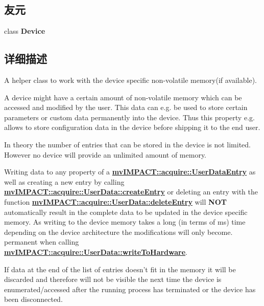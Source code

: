 \subsection*{友元}
\begin{DoxyCompactItemize}
\item 
\hypertarget{classmv_i_m_p_a_c_t_1_1acquire_1_1_user_data_a520fa05e0bf58785da428f7a0241eee2}{class {\bfseries Device}}\label{classmv_i_m_p_a_c_t_1_1acquire_1_1_user_data_a520fa05e0bf58785da428f7a0241eee2}

\end{DoxyCompactItemize}


\subsection{详细描述}
A helper class to work with the device specific non-\/volatile memory(if available). 

A device might have a certain amount of non-\/volatile memory which can be accessed and modified by the user. This data can e.\+g. be used to store certain parameters or custom data permanently into the device. Thus this property e.\+g. allows to store configuration data in the device before shipping it to the end user.

In theory the number of entries that can be stored in the device is not limited. However no device will provide an unlimited amount of memory.

Writing data to any property of a {\bfseries \hyperlink{classmv_i_m_p_a_c_t_1_1acquire_1_1_user_data_entry}{mv\+I\+M\+P\+A\+C\+T\+::acquire\+::\+User\+Data\+Entry}} as well as creating a new entry by calling {\bfseries \hyperlink{classmv_i_m_p_a_c_t_1_1acquire_1_1_user_data_a693c8931c71b9911657636bd07ab1e09}{mv\+I\+M\+P\+A\+C\+T\+::acquire\+::\+User\+Data\+::create\+Entry}} or deleting an entry with the function {\bfseries \hyperlink{classmv_i_m_p_a_c_t_1_1acquire_1_1_user_data_a5c3bcff4890369e8c8b446fa0344e7ed}{mv\+I\+M\+P\+A\+C\+T\+::acquire\+::\+User\+Data\+::delete\+Entry}} will {\bfseries N\+O\+T} automatically result in the complete data to be updated in the device specific memory. As writing to the device memory takes a long (in terms of ms) time depending on the device architecture the modifications will only become. permanent when calling {\bfseries \hyperlink{classmv_i_m_p_a_c_t_1_1acquire_1_1_user_data_ae6e2e87a923281c6a821b0f221b968b8}{mv\+I\+M\+P\+A\+C\+T\+::acquire\+::\+User\+Data\+::write\+To\+Hardware}}.

If data at the end of the list of entries doesn't fit in the memory it will be discarded and therefore will not be visible the next time the device is enumerated/accessed after the running process has terminated or the device has been disconnected.

